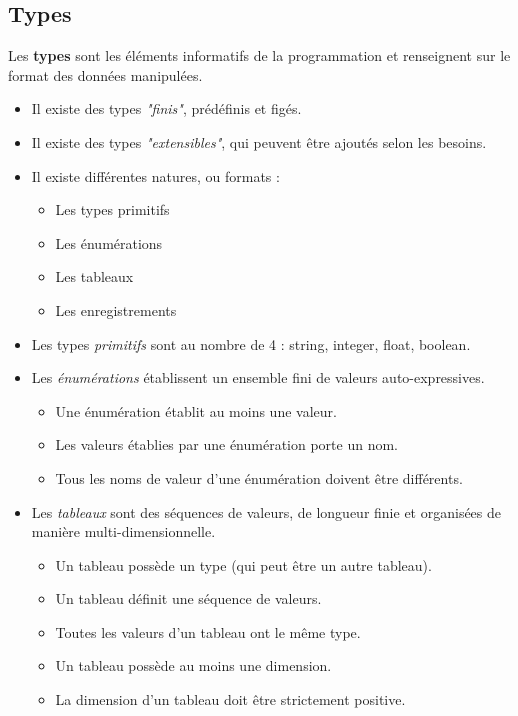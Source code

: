 \subsection{Types}
Les \textbf{types} sont les éléments informatifs de la programmation et renseignent sur le format des données manipulées.
\begin{itemize}
    \item Il existe des types \textit{"finis"}, prédéfinis et figés.
    \item Il existe des types \textit{"extensibles"}, qui peuvent être ajoutés selon les besoins.
    \item Il existe différentes natures, ou formats : 
        \begin{itemize}
            \item Les types primitifs
            \item Les énumérations
            \item Les tableaux
            \item Les enregistrements
        \end{itemize}
    
    \item Les types \textit{primitifs} sont au nombre de 4 : string, integer, float, boolean.
    
    \item Les \textit{énumérations} établissent un ensemble fini de valeurs auto-expressives.
        \begin{itemize}
            \item Une énumération établit au moins une valeur.
            \item Les valeurs établies par une énumération porte un nom.
            \item Tous les noms de valeur d'une énumération doivent être différents.
        \end{itemize}
        
    \item Les \textit{tableaux} sont des séquences de valeurs, de longueur finie et organisées de manière multi-dimensionnelle.
        \begin{itemize}
            \item Un tableau possède un type (qui peut être un autre tableau).
            \item Un tableau définit une séquence de valeurs.
            \item Toutes les valeurs d'un tableau ont le même type.
            \item Un tableau possède au moins une dimension.
            \item La dimension d'un tableau doit être strictement positive.
        \end{itemize}
        

\end{itemize}
